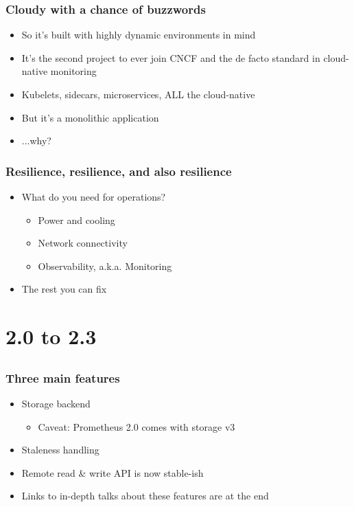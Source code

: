 \documentclass[aspectratio=169]{beamer}
\begin{document}
\begin{frame}
	\frametitle{Cloudy with a chance of buzzwords}
	\begin{itemize}
		\item So it's built with highly dynamic environments in mind
		\item It's the second project to ever join CNCF and the de facto standard in cloud-native monitoring
		\item Kubelets, sidecars, microservices, ALL the cloud-native
		\vfill
		\item But it's a monolithic application
		\vfill
		\item ...why?
	\end{itemize}
\end{frame}

\begin{frame}
	\frametitle{Resilience, resilience, and also resilience}
	\begin{itemize}
		\item What do you need for operations?
		\begin{itemize}
			\item Power and cooling
			\item Network connectivity
			\item Observability, a.k.a. Monitoring
		\end{itemize}
		\item The rest you can fix
	\end{itemize}
\end{frame}


\section{2.0 to 2.3}
\subsection{}

\begin{frame}
	\frametitle{Three main features}
	\begin{itemize}
		\item Storage backend
		\begin{itemize}
			\item Caveat: Prometheus 2.0 comes with storage v3
		\end{itemize}
		\item Staleness handling
		\item Remote read \& write API is now stable-ish
		\item Links to in-depth talks about these features are at the end
	\end{itemize}
\end{frame}
\end{document}
